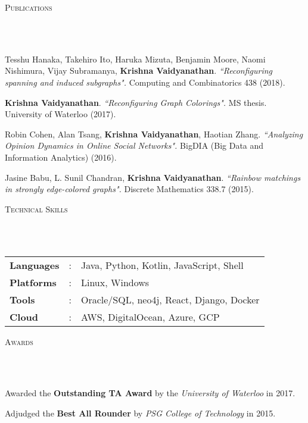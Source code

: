 \documentclass{article}
\newcommand{\header}[1]{{
\hspace*{-15pt}\vspace*{6pt} \textsc{#1}} \vspace*{-6pt} 
\lineunder
}
\newcommand{\lineunder}{
\vspace*{-8pt} \\ \hspace*{-18pt} 
\hrulefill \\
}
\renewcommand{\labelitemii}{
$\vcenter{\hbox{\tiny$\bullet$}}$\hspace*{-3pt}
}
\newenvironment{bullet-list-major}{
\begin{list}{\labelitemii}{\setlength\leftmargin{3pt} 
\topsep 0pt \itemsep -2pt}}{\vspace*{4pt}\end{list}
}
\begin{document}
\vspace*{4pt}%
\header{Publications}
\begin{bullet-list-major}
\item Tesshu Hanaka, Takehiro Ito, Haruka Mizuta, Benjamin Moore, Naomi
Nishimura, Vijay Subramanya, \textbf{Krishna Vaidyanathan}. \textit{``Reconfiguring
spanning and induced subgraphs".} Computing and Combinatorics 438 (2018).
\item \textbf{Krishna Vaidyanathan}. \textit{``Reconfiguring Graph Colorings".} MS thesis. University of Waterloo (2017).
\item Robin Cohen, Alan Tsang, \textbf{Krishna Vaidyanathan}, Haotian Zhang. \textit{``Analyzing Opinion Dynamics in Online Social Networks".} BigDIA (Big Data and Information Analytics) (2016).
\item Jasine  Babu,  L.  Sunil  Chandran, \textbf{Krishna  Vaidyanathan}.
\textit{``Rainbow matchings in strongly edge-colored graphs".} Discrete Mathematics 338.7 (2015).
\end{bullet-list-major}

\vspace*{4pt}%
\header{Technical Skills}
\begin{tabular}{l l l}

\textbf{Languages}&: & Java, Python, Kotlin, JavaScript, Shell\\
\textbf{Platforms}&:  & Linux, Windows\\
\textbf{Tools}&:     &Oracle/SQL, neo4j, React, Django, Docker\\
\textbf{Cloud}&:     &AWS, DigitalOcean, Azure, GCP
\end{tabular}


\vspace*{4pt}%
\header{Awards}
    \begin{bullet-list-major}
    \item Awarded the \textbf{Outstanding TA Award} by the \textit{University of Waterloo} in 2017.
    \item Adjudged the \textbf{Best All Rounder} by \textit{PSG College of Technology} in 2015.  
    \end{bullet-list-major}
\end{document}
